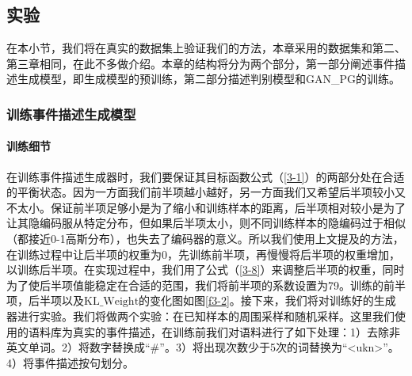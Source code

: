 \documentclass[]{template}
\begin{document}
\subsection{实验}
在本小节，我们将在真实的数据集上验证我们的方法，本章采用的数据集和第二、第三章相同，在此不多做介绍。本章的结构将分为两个部分，第一部分阐述事件描述生成模型，即生成模型的预训练，第二部分描述判别模型和GAN\_PG的训练。
\subsubsection{训练事件描述生成模型}\label{train_generator}
\paragraph{训练细节}
在训练事件描述生成器时，我们要保证其目标函数公式（\ref{3-1}）的两部分处在合适的平衡状态。因为一方面我们前半项越小越好，另一方面我们又希望后半项较小又不太小。保证前半项足够小是为了缩小和训练样本的距离，后半项相对较小是为了让其隐编码服从特定分布，但如果后半项太小，则不同训练样本的隐编码过于相似（都接近0-1高斯分布），也失去了编码器的意义。所以我们使用上文提及的方法，在训练过程中让后半项的权重为0，先训练前半项，再慢慢将后半项的权重增加，以训练后半项。在实现过程中，我们用了公式（\ref{3-8}）来调整后半项的权重，同时为了使后半项值能稳定在合适的范围，我们将前半项的系数设置为79。训练的前半项，后半项以及$\mathrm{KL\_Weight}$的变化图如图\ref{f3-2}。接下来，我们将对训练好的生成器进行实验。我们将做两个实验：在已知样本的周围采样和随机采样。这里我们使用的语料库为真实的事件描述，在训练前我们对语料进行了如下处理：1）去除非英文单词。2）将数字替换成“\#”。3）将出现次数少于5次的词替换为“<ukn>”。4）将事件描述按句划分。
\end{document}
